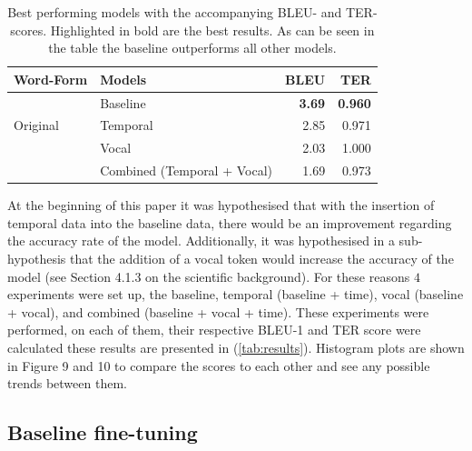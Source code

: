 \begin{table}[h]
    \caption{Best performing models with the accompanying BLEU- and TER-scores. Highlighted in bold are the best results. As can be seen in the table the baseline outperforms all other models.}
    \label{tab:results}
    \begin{tabular}{llrr}
        \toprule
                                                                  
        Word-Form                   &  Models                           &  BLEU                & TER    \\ 
        \midrule
        \multirow{3}{*}{Original}  &  Baseline                              &   \textbf{3.69}      &  \textbf{0.960} \\
                              & Temporal                                &   2.85               &  0.971 \\
                              & Vocal                                   &   2.03               &  1.000 \\
                              & Combined (Temporal + Vocal)             &   1.69               &  0.973 \\
    
        
    \end{tabular}
    
\end{table}


At the beginning of this paper it was hypothesised that with the insertion of temporal data into the baseline data, there would be an improvement regarding the accuracy rate of the model. Additionally, it was hypothesised in a sub-hypothesis that the addition of a vocal token would increase the accuracy of the model (see Section 4.1.3 on the scientific background). For these reasons $4$ experiments were set up, the baseline, temporal (baseline + time), vocal (baseline + vocal), and combined (baseline + vocal + time). These experiments were performed, on each of them, their respective BLEU-1 and TER score were calculated these results are presented in (\autoref{tab:results}). Histogram plots are shown in Figure 9 and 10 to compare the scores to each other and see any possible trends between them.

\subsection{Baseline fine-tuning}


